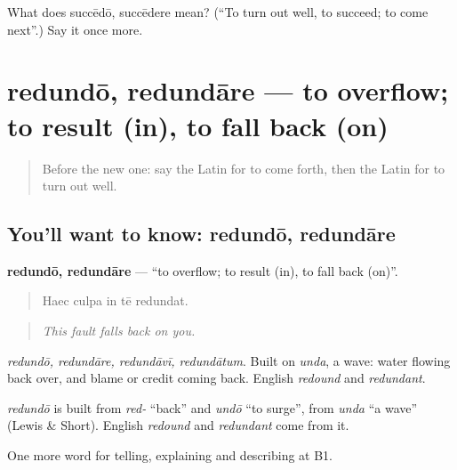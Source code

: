 \begin{tcolorbox}[breakable,colback=teal!4,colframe=teal!35!black,title={Before you move on}]
What does succēdō, succēdere mean? (\textquotedblleft{}To turn out well, to succeed; to come next\textquotedblright{}.) Say it once more.
\end{tcolorbox}
\section[redundō, redundāre]{redundō, redundāre — to overflow; to result (in), to fall back (on)}

\label{lesson:LA-C373-redundo}



\begin{quote}
Before the new one: say the Latin for to come forth, then the Latin for to turn out well.
\end{quote}

\subsection*{You'll want to know: redundō, redundāre}
\textbf{redundō, redundāre} — \textquotedblleft{}to overflow; to result (in), to fall back (on)\textquotedblright{}.

\begin{quote}
Haec culpa in tē redundat.
\end{quote}

\begin{quote}
\emph{This fault falls back on you.}
\end{quote}

\emph{redundō, redundāre, redundāvī, redundātum}. Built on \emph{unda}, a wave: water flowing back over, and blame or credit coming back. English \emph{redound} and \emph{redundant}.

\begin{cousinweb}
\emph{redundō} is built from \emph{red-} \textquotedblleft{}back\textquotedblright{} and \emph{undō} \textquotedblleft{}to surge\textquotedblright{}, from \emph{unda} \textquotedblleft{}a wave\textquotedblright{} (Lewis \& Short). English \emph{redound} and \emph{redundant} come from it.
\end{cousinweb}

\begin{grammarlens}[title={What you've built}]
One more word for telling, explaining and describing at B1.
\end{grammarlens}

